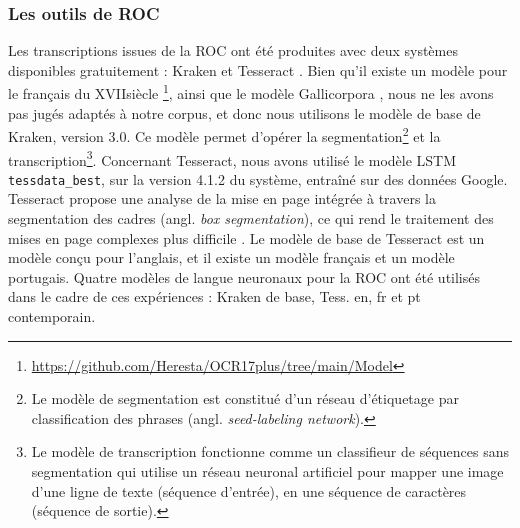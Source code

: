 \subsubsection{Les outils de ROC}
Les transcriptions issues de la ROC ont été produites avec deux systèmes disponibles gratuitement : Kraken \cite{kiessling2019kraken} et Tesseract \cite{smith2007overview}. Bien qu'il existe un modèle pour le français du XVII\ieme{}siècle \cite{gabay:hal-02577236}\footnote{\url{https://github.com/Heresta/OCR17plus/tree/main/Model}}, ainsi que le modèle Gallicorpora \cite{pinche_2022_7410529}, nous ne les avons pas jugés adaptés à notre corpus, et donc nous utilisons le modèle de base de Kraken, version 3.0. Ce modèle permet d'opérer la segmentation\footnote{Le modèle de segmentation est constitué d'un réseau d'étiquetage par classification des phrases (angl. \textit{seed-labeling network}).
} et la transcription\footnote{Le modèle de transcription fonctionne comme un classifieur de séquences sans segmentation qui utilise un réseau neuronal artificiel pour mapper une image d'une ligne de texte (séquence d'entrée), en une séquence de caractères (séquence de sortie). 
}.
 Concernant Tesseract, nous avons utilisé le modèle LSTM \texttt{tessdata\_best}, sur la version 4.1.2 du système, entraîné sur des données Google. Tesseract propose une analyse de la mise en page intégrée à travers la segmentation des cadres (angl. \textit{box segmentation}), ce qui rend le traitement des mises en page complexes plus difficile \cite{reul2017case}. Le modèle de base de Tesseract est un modèle conçu pour l'anglais, et il existe un modèle français et un modèle portugais. Quatre modèles de langue neuronaux pour la ROC ont été utilisés dans le cadre de ces expériences : Kraken de base, Tess. en, fr et pt contemporain.


